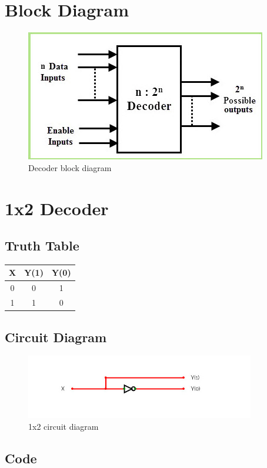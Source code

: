 \documentclass[titlepage]{article}
\begin{document}
    \section{Block Diagram} 
    \begin{figure}[!ht]
        \centering
        \includegraphics{./figures/Decoder-Block-Diagram.jpg}
        \caption{Decoder block diagram}
    \end{figure}

    \section{1x2 Decoder}
    \subsection{Truth Table}
    \begin{tabular}{ | c | c | c |}
        \hline
        X & Y(1) & Y(0) \\
        \hline
        0 & 0 & 1 \\
        1 & 1 & 0 \\
        \hline
    \end{tabular}
    \subsection{Circuit Diagram}
    \begin{figure}[!ht]
        \centering
        \includegraphics[width=10cm]{./figures/1x2.jpeg}
        \caption{1x2 circuit diagram}
    \end{figure}
    \subsection{Code}
\end{document}
